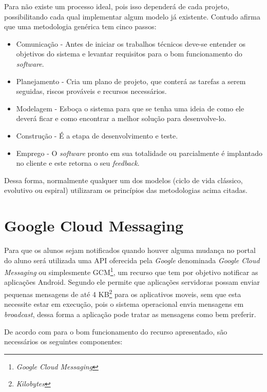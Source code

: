 	\par Para  não existe um processo ideal, pois isso
dependerá de cada projeto, possibilitando cada qual implementar algum modelo já
existente. Contudo  afirma que uma metodologia
genérica tem cinco passos:
	\begin{itemize}
	  
	  \item Comunicação - Antes de iniciar os trabalhos técnicos deve-se entender
	  os objetivos do sistema e levantar requisitos para o bom funcionamento do
	  \textit{software}.
	  
	  \item Planejamento - Cria um plano de projeto, que conterá as tarefas a
	  serem seguidas, riscos prováveis e recursos necessários.
	  
	  \item Modelagem - Esboça o sistema para que se tenha uma ideia de como ele
	  deverá ficar e como encontrar a melhor solução para desenvolve-lo.
	  
	  \item Construção - É a etapa de desenvolvimento e teste.
	  
	  \item Emprego - O \textit{software} pronto em sua totalidade ou parcialmente
	  é implantado no cliente e este retorna o seu \textit{feedback}.
	 
	 \end{itemize}
	 
	 \par Dessa forma, normalmente qualquer um dos modelos (ciclo de vida clássico,
evolutivo ou espiral) utilizaram os princípios das metodologias acima citadas.
	
\section{\textbf{Google Cloud 	Messaging}}

	\par Para que os alunos sejam notificados quando houver alguma mudança no
portal do aluno será utilizada uma API oferecida pela \textit{Google}
denominada \textit{Google Cloud Messaging} ou simplesmente
GCM\footnote{\textit{Google Cloud Messaging}}, um recurso que tem por objetivo
notificar as aplicações Android. Segundo  ele permite que
aplicações servidoras possam enviar pequenas mensagens de até 4
KB\footnote{\textit{Kilobytes}} para os aplicativos moveis, sem que esta
necessite estar em execução, pois o sistema operacional envia mensagens em
\textit{broadcast}, dessa forma a aplicação pode tratar as mensagens como bem
preferir.
	\par De acordo com  para o bom funcionamento do recurso
apresentado, são necessários os seguintes componentes:

